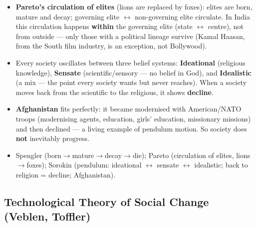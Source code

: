 \begin{KeyConcept}
\begin{itemize}
    \item \textbf{Pareto's circulation of elites} (lions are replaced by foxes): elites are born, mature and decay; governing elite $\leftrightarrow$ non-governing elite circulate. In India this circulation happens \textbf{within} the governing elite (state $\leftrightarrow$ centre), not from outside --- only those with a political lineage survive (Kamal Haasan, from the South film industry, is an exception, not Bollywood).
\end{itemize}
\end{KeyConcept}

\begin{KeyConcept}
\begin{itemize}
    \item Every society oscillates between three belief systems: \textbf{Ideational} (religious knowledge), \textbf{Sensate} (scientific/sensory --- no belief in God), and \textbf{Idealistic} (a mix --- the point every society wants but never reaches). When a society moves back from the scientific to the religious, it shows \textbf{decline}.
    \item \textbf{Afghanistan} fits perfectly: it became modernised with American/NATO troops (modernising agents, education, girls' education, missionary missions) and then declined --- a living example of pendulum motion. So society does \textbf{not} inevitably progress.
\end{itemize}
\end{KeyConcept}

\begin{QuickRevision}
\begin{itemize}
    \item Spengler (born$\rightarrow$mature$\rightarrow$decay$\rightarrow$die); Pareto (circulation of elites, lions$\rightarrow$foxes); Sorokin (pendulum: ideational $\leftrightarrow$ sensate $\leftrightarrow$ idealistic; back to religion = decline; Afghanistan).
\end{itemize}
\end{QuickRevision}

\sectiondivider

\subsection{Technological Theory of Social Change (Veblen, Toffler)}

